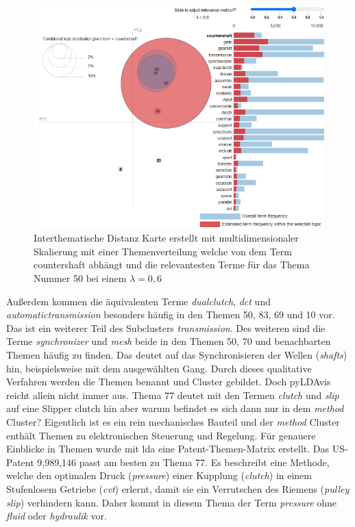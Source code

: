\begin{landscape}
	\begin{figure}[htpb]
		\centering
		\includegraphics[width=19.29cm,keepaspectratio=true]{img/clustering_process02.png}
		\caption{
			Interthematische Distanz Karte erstellt mit multidimensionaler Skalierung mit einer Themenverteilung welche von dem Term countershaft abhängt und die relevantesten Terme für das Thema Nummer 50 bei einem $\lambda = 0,6$ 
		}
		\label{fig:clustering_process02}
	\end{figure}
\end{landscape}

 
Außerdem kommen die äquivalenten Terme \emph{dualclutch}, \emph{\gls{dct}} und \emph{automatictransmission} besonders häufig in den Themen 50, 83, 69 und 10 vor. Das ist ein weiterer Teil des Subclusters \emph{transmission}. Des weiteren sind die Terme \emph{synchronizer} und \emph{mesh} beide in den Themen 50, 70 und benachbarten Themen häufig zu finden. Das deutet auf das Synchronisieren der Wellen (\emph{shafts}) hin, beispielsweise mit dem ausgewählten Gang. Durch dieses qualitative Verfahren werden die Themen benannt und Cluster gebildet. Doch \gls{pyLDAvis} reicht allein nicht immer aus. Thema 77 deutet mit den Termen \emph{clutch} und \emph{slip} auf eine Slipper clutch hin aber warum befindet es sich dann nur in dem \emph{method} Cluster? Eigentlich ist es ein rein mechanisches Bauteil und der \emph{method} Cluster enthält Themen zu elektronischen Steuerung und Regelung. Für genauere Einblicke in Themen wurde mit \gls{lda} eine Patent-Themen-Matrix erstellt. Das US-Patent 9,989,146 passt am besten zu Thema 77. Es beschreibt eine Methode, welche den optimalen Druck (\emph{pressure}) einer Kupplung (\emph{clutch}) in einem Stufenlosem Getriebe (\emph{\gls{cvt}}) erlernt, damit sie ein Verrutschen des Riemens (\emph{pulley slip}) verhindern kann. Daher kommt in diesem Thema der Term \emph{pressure} ohne \emph{fluid} oder \emph{hydraulik} vor.
 
